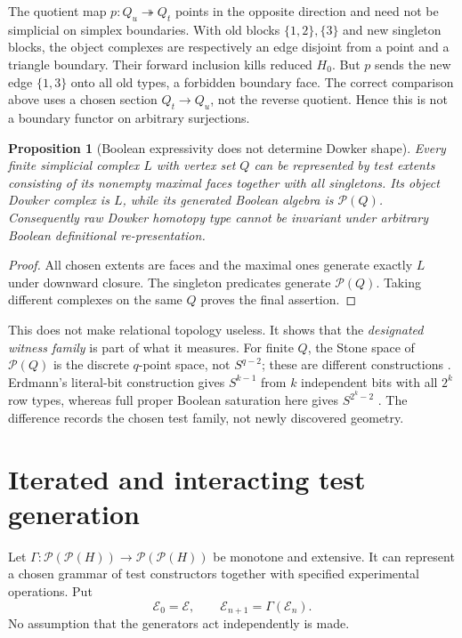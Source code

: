 \documentclass[11pt]{article}
\newtheorem{proposition}[theorem]{Proposition}
\theoremstyle{definition}
\newcommand{\Pow}{\mathcal P}
\begin{document}
The quotient map $p:Q_u\twoheadrightarrow Q_t$ points in the opposite
direction and need not be simplicial on simplex boundaries. With old
blocks $\{1,2\},\{3\}$ and new singleton blocks, the object complexes
are respectively an edge disjoint from a point and a triangle boundary.
Their forward inclusion kills reduced $H_0$. But $p$ sends the new edge
$\{1,3\}$ onto all old types, a forbidden boundary face. The correct
comparison above uses a chosen section $Q_t\to Q_u$, not the reverse
quotient. Hence this is not a boundary functor on arbitrary surjections.

\begin{proposition}[Boolean expressivity does not determine Dowker shape]
Every finite simplicial complex $L$ with vertex set $Q$ can be represented
by test extents consisting of its nonempty maximal faces together with all
singletons. Its object Dowker complex is $L$, while its generated Boolean
algebra is $\Pow(Q)$. Consequently raw Dowker homotopy type cannot be
invariant under arbitrary Boolean definitional re-presentation.
\end{proposition}
\begin{proof}
All chosen extents are faces and the maximal ones generate exactly $L$
under downward closure. The singleton predicates generate $\Pow(Q)$.
Taking different complexes on the same $Q$ proves the final assertion.
\end{proof}

This does not make relational topology useless. It shows that the
\emph{designated witness family} is part of what it measures. For finite
$Q$, the Stone space of $\Pow(Q)$ is the discrete $q$-point space, not
$S^{q-2}$; these are different constructions \cite{Stone}. Erdmann's
literal-bit construction gives $S^{k-1}$ from $k$ independent bits with
all $2^k$ row types, whereas full proper Boolean saturation here gives
$S^{2^k-2}$ \cite[Section 8]{Erdmann}. The difference records the
chosen test family, not newly discovered geometry.

\section{Iterated and interacting test generation}

Let $\Gamma:\Pow(\Pow(H))\to\Pow(\Pow(H))$ be monotone and extensive.
It can represent a chosen grammar of test constructors together with
specified experimental operations. Put
\[
 \mathcal E_0=\mathcal E,\qquad
 \mathcal E_{n+1}=\Gamma(\mathcal E_n).
\]
No assumption that the generators act independently is made.
\end{document}

